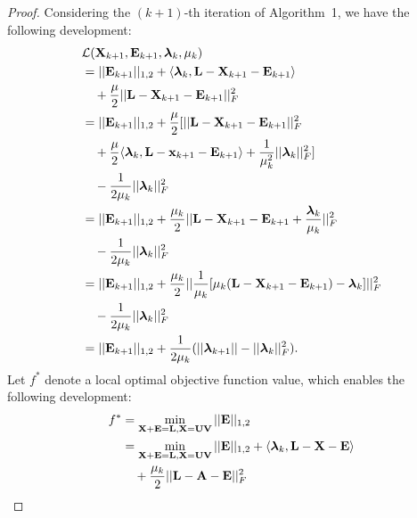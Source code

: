 \documentclass[letterpaper]{article}
\def\bA{{\bf A}}
\def\bE{{\bf E}}
\def\blambda{{\bm \lambda}}
\def\calL{{\mathcal{L}}}
\def\bL{{\bf L}}
\def\bU{{\bf U}}
\def\bV{{\bf V}}
\def\bX{{\bf X}}
\def\bx{{\bf x}}
\def\bA{{\bf A}}
\def\bx{{\bf x}}
\def\bX{{\bf X}}
\begin{document}
\begin{proof}
    Considering the $(k+1)$-th iteration of Algorithm~1, we have the following development:
    \begin{align}\label{eq:proof1}
      & \calL(\bX_{k+1}, \bE_{k+1}, \blambda_{k}, \mu_{k})   \nonumber \\
      & = || \bE_{k+1} ||_{1,2} + \langle \blambda_{k}, \bL - \bX_{k+1} - \bE_{k+1} \rangle  \nonumber \\
      & \quad + \frac{\mu}{2} || \bL - \bX_{k+1} - \bE_{k+1} ||_{F}^2         \nonumber \\
      & = || \bE_{k+1} ||_{1,2} + \frac{\mu}{2} [ || \bL - \bX_{k+1} - \bE_{k+1} ||_{F}^2  \nonumber \\
      & \quad + \frac{\mu}{2} \langle \blambda_{k}, \bL - \bx_{k+1} - \bE_{k+1} \rangle + \frac{1}{\mu_{k}^2} || \blambda_k ||_F^2 ] \nonumber \\
      & \quad - \frac{1}{2\mu_k} || \blambda_k ||_F^2    \nonumber  \\
      & = || \bE_{k+1} ||_{1,2} + \frac{\mu_k}{2} || \bL - \bX_{k+1} - \bE_{k+1} + \frac{\blambda_k}{\mu_k} ||_F^2 \nonumber \\
      & \quad - \frac{1}{2\mu_k} || \blambda_k ||_F^2   \nonumber \\
      & = || \bE_{k+1} ||_{1,2} + \frac{\mu_k}{2} || \frac{1}{\mu_k} [ \mu_k (\bL - \bX_{k+1} - \bE_{k+1}) - \blambda_k ] ||_F^2  \nonumber \\
      & \quad - \frac{1}{2\mu_k} || \blambda_k ||_F^2   \nonumber \\
      & = || \bE_{k+1} ||_{1,2} + \frac{1}{2\mu_k} ( || \blambda_{k+1} || - || \blambda_{k} ||_F^2 )   .
    \end{align}
    \noindent
    Let $f^*$ denote a local optimal objective function value, which enables the following development:
    \begin{align}\label{eq:proof2}
      f^* & = \min_{\bX + \bE = \bL, \bX = \bU \bV} || \bE ||_{1,2}   \nonumber  \\
          & = \min_{\bX + \bE = \bL, \bX = \bU \bV} || \bE ||_{1,2} + \langle \blambda_k, \bL - \bX - \bE \rangle \nonumber \\
          & \quad + \frac{\mu_k}{2} || \bL - \bA - \bE ||_F^2   \nonumber \\

\end{align}
\end{proof}
\end{document}

